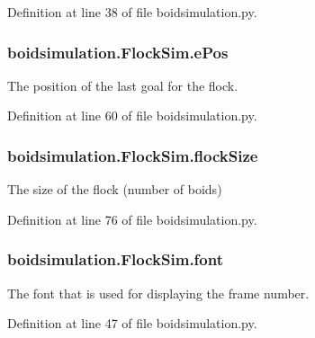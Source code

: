 Definition at line 38 of file boidsimulation.\-py.

\hypertarget{classboidsimulation_1_1FlockSim_acb064f74364917a97ca9d3accdf96f45}{
\subsubsection[{e\-Pos}]{\setlength{\rightskip}{0pt plus 5cm}boidsimulation.\-Flock\-Sim.\-e\-Pos}}\label{classboidsimulation_1_1FlockSim_acb064f74364917a97ca9d3accdf96f45}


The position of the last goal for the flock. 



Definition at line 60 of file boidsimulation.\-py.

\hypertarget{classboidsimulation_1_1FlockSim_a125fa6c2909527f18c768f09606ab442}{
\subsubsection[{flock\-Size}]{\setlength{\rightskip}{0pt plus 5cm}boidsimulation.\-Flock\-Sim.\-flock\-Size}}\label{classboidsimulation_1_1FlockSim_a125fa6c2909527f18c768f09606ab442}


The size of the flock (number of boids) 



Definition at line 76 of file boidsimulation.\-py.

\hypertarget{classboidsimulation_1_1FlockSim_aa5993f8033dcbbb0383c204877d1dd20}{
\subsubsection[{font}]{\setlength{\rightskip}{0pt plus 5cm}boidsimulation.\-Flock\-Sim.\-font}}\label{classboidsimulation_1_1FlockSim_aa5993f8033dcbbb0383c204877d1dd20}


The font that is used for displaying the frame number. 



Definition at line 47 of file boidsimulation.\-py.

